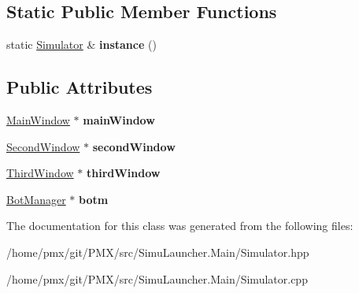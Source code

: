 \subsection*{Static Public Member Functions}
\begin{DoxyCompactItemize}
\item 
\mbox{\label{classSimulator_a4b1f4677c6867457aea92432f28a688f}} 
static \hyperlink{classSimulator}{Simulator} \& {\bfseries instance} ()
\end{DoxyCompactItemize}
\subsection*{Public Attributes}
\begin{DoxyCompactItemize}
\item 
\mbox{\label{classSimulator_a240494c98956aa4efc84bb2f902e2f54}} 
\hyperlink{classMainWindow}{Main\+Window} $\ast$ {\bfseries main\+Window}
\item 
\mbox{\label{classSimulator_a590777469a8ded5c4b197bcdab97009e}} 
\hyperlink{classSecondWindow}{Second\+Window} $\ast$ {\bfseries second\+Window}
\item 
\mbox{\label{classSimulator_af8bce2d097e49d68e9e41869d264a098}} 
\hyperlink{classThirdWindow}{Third\+Window} $\ast$ {\bfseries third\+Window}
\item 
\mbox{\label{classSimulator_a31ac3e605ed72b748d7635d486c00d2b}} 
\hyperlink{classBotManager}{Bot\+Manager} $\ast$ {\bfseries botm}
\end{DoxyCompactItemize}


The documentation for this class was generated from the following files\+:\begin{DoxyCompactItemize}
\item 
/home/pmx/git/\+P\+M\+X/src/\+Simu\+Launcher.\+Main/Simulator.\+hpp\item 
/home/pmx/git/\+P\+M\+X/src/\+Simu\+Launcher.\+Main/Simulator.\+cpp\end{DoxyCompactItemize}
